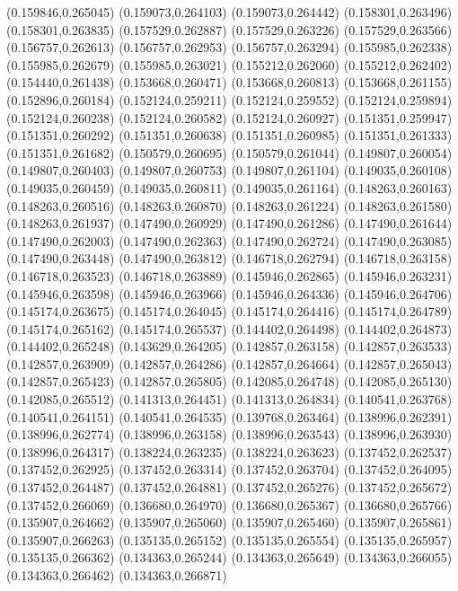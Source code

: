 (0.159846,0.265045)
(0.159073,0.264103)
(0.159073,0.264442)
(0.158301,0.263496)
(0.158301,0.263835)
(0.157529,0.262887)
(0.157529,0.263226)
(0.157529,0.263566)
(0.156757,0.262613)
(0.156757,0.262953)
(0.156757,0.263294)
(0.155985,0.262338)
(0.155985,0.262679)
(0.155985,0.263021)
(0.155212,0.262060)
(0.155212,0.262402)
(0.154440,0.261438)
(0.153668,0.260471)
(0.153668,0.260813)
(0.153668,0.261155)
(0.152896,0.260184)
(0.152124,0.259211)
(0.152124,0.259552)
(0.152124,0.259894)
(0.152124,0.260238)
(0.152124,0.260582)
(0.152124,0.260927)
(0.151351,0.259947)
(0.151351,0.260292)
(0.151351,0.260638)
(0.151351,0.260985)
(0.151351,0.261333)
(0.151351,0.261682)
(0.150579,0.260695)
(0.150579,0.261044)
(0.149807,0.260054)
(0.149807,0.260403)
(0.149807,0.260753)
(0.149807,0.261104)
(0.149035,0.260108)
(0.149035,0.260459)
(0.149035,0.260811)
(0.149035,0.261164)
(0.148263,0.260163)
(0.148263,0.260516)
(0.148263,0.260870)
(0.148263,0.261224)
(0.148263,0.261580)
(0.148263,0.261937)
(0.147490,0.260929)
(0.147490,0.261286)
(0.147490,0.261644)
(0.147490,0.262003)
(0.147490,0.262363)
(0.147490,0.262724)
(0.147490,0.263085)
(0.147490,0.263448)
(0.147490,0.263812)
(0.146718,0.262794)
(0.146718,0.263158)
(0.146718,0.263523)
(0.146718,0.263889)
(0.145946,0.262865)
(0.145946,0.263231)
(0.145946,0.263598)
(0.145946,0.263966)
(0.145946,0.264336)
(0.145946,0.264706)
(0.145174,0.263675)
(0.145174,0.264045)
(0.145174,0.264416)
(0.145174,0.264789)
(0.145174,0.265162)
(0.145174,0.265537)
(0.144402,0.264498)
(0.144402,0.264873)
(0.144402,0.265248)
(0.143629,0.264205)
(0.142857,0.263158)
(0.142857,0.263533)
(0.142857,0.263909)
(0.142857,0.264286)
(0.142857,0.264664)
(0.142857,0.265043)
(0.142857,0.265423)
(0.142857,0.265805)
(0.142085,0.264748)
(0.142085,0.265130)
(0.142085,0.265512)
(0.141313,0.264451)
(0.141313,0.264834)
(0.140541,0.263768)
(0.140541,0.264151)
(0.140541,0.264535)
(0.139768,0.263464)
(0.138996,0.262391)
(0.138996,0.262774)
(0.138996,0.263158)
(0.138996,0.263543)
(0.138996,0.263930)
(0.138996,0.264317)
(0.138224,0.263235)
(0.138224,0.263623)
(0.137452,0.262537)
(0.137452,0.262925)
(0.137452,0.263314)
(0.137452,0.263704)
(0.137452,0.264095)
(0.137452,0.264487)
(0.137452,0.264881)
(0.137452,0.265276)
(0.137452,0.265672)
(0.137452,0.266069)
(0.136680,0.264970)
(0.136680,0.265367)
(0.136680,0.265766)
(0.135907,0.264662)
(0.135907,0.265060)
(0.135907,0.265460)
(0.135907,0.265861)
(0.135907,0.266263)
(0.135135,0.265152)
(0.135135,0.265554)
(0.135135,0.265957)
(0.135135,0.266362)
(0.134363,0.265244)
(0.134363,0.265649)
(0.134363,0.266055)
(0.134363,0.266462)
(0.134363,0.266871)
